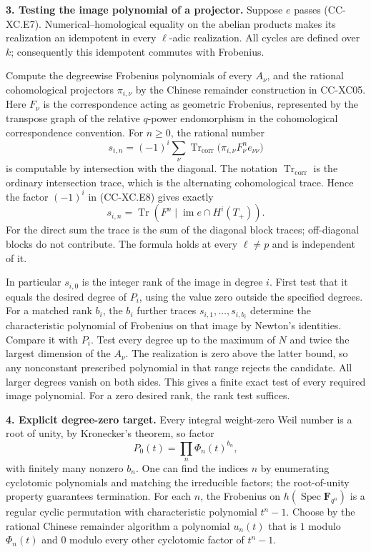 \textbf{3. Testing the image polynomial of a projector.} Suppose \(e\)
passes (CC-XC.E7). Numerical--homological equality on the abelian
products makes its realization an idempotent in every \(\ell\)-adic
realization. All cycles are defined over \(k\); consequently this
idempotent commutes with Frobenius.

Compute the degreewise Frobenius polynomials of every \(A_\nu\), and the
rational cohomological projectors \(\pi_{i,\nu}\) by the Chinese
remainder construction in CC-XC05. Here \(F_\nu\) is the correspondence
acting as geometric Frobenius, represented by the transpose graph of the
relative \(q\)-power endomorphism in the cohomological correspondence
convention. For \(n\ge0\), the rational number \[
 s_{i,n}=(-1)^i\sum_\nu
   \operatorname{Tr}_{\mathrm{corr}}
       \bigl(\pi_{i,\nu}F_\nu^n e_{\nu\nu}\bigr)
                                                        \tag{CC-XC.E8}
\] is computable by intersection with the diagonal. The notation
\(\operatorname{Tr}_{\mathrm{corr}}\) is the ordinary intersection
trace, which is the alternating cohomological trace. Hence the factor
\((-1)^i\) in (CC-XC.E8) gives exactly \[
 s_{i,n}=\operatorname{Tr}
       (F^n\mid\operatorname{im}e\cap H^i(T_+)).
 \] For the direct sum the trace is the sum of the diagonal block
traces; off-diagonal blocks do not contribute. The formula holds at
every \(\ell\ne p\) and is independent of it.

In particular \(s_{i,0}\) is the integer rank of the image in degree
\(i\). First test that it equals the desired degree of \(P_i\), using
the value zero outside the specified degrees. For a matched rank
\(b_i\), the \(b_i\) further traces \(s_{i,1},\ldots,s_{i,b_i}\)
determine the characteristic polynomial of Frobenius on that image by
Newton's identities. Compare it with \(P_i\). Test every degree up to
the maximum of \(N\) and twice the largest dimension of the \(A_\nu\).
The realization is zero above the latter bound, so any nonconstant
prescribed polynomial in that range rejects the candidate. All larger
degrees vanish on both sides. This gives a finite exact test of every
required image polynomial. For a zero desired rank, the rank test
suffices.

\textbf{4. Explicit degree-zero target.} Every integral weight-zero Weil
number is a root of unity, by Kronecker's theorem, so factor \[
                       P_0(t)=\prod_n\Phi_n(t)^{b_n},
                                                        \tag{CC-XC.E9}
\] with finitely many nonzero \(b_n\). One can find the indices \(n\) by
enumerating cyclotomic polynomials and matching the irreducible factors;
the root-of-unity property guarantees termination. For each \(n\), the
Frobenius on \(h(\operatorname{Spec}\mathbf F_{q^n})\) is a regular
cyclic permutation with characteristic polynomial \(t^n-1\). Choose by
the rational Chinese remainder algorithm a polynomial \(u_n(t)\) that is
\(1\) modulo \(\Phi_n(t)\) and \(0\) modulo every other cyclotomic
factor of \(t^n-1\).

